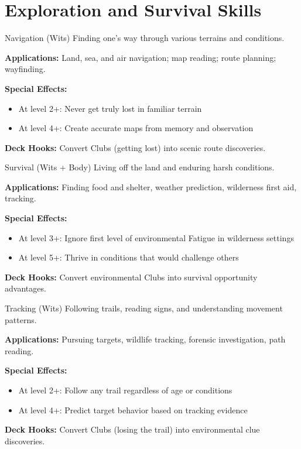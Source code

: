 \section{Exploration and Survival Skills}

\begin{skillbox}{Navigation (Wits)}
Finding one's way through various terrains and conditions.

\textbf{Applications:} Land, sea, and air navigation; map reading; route planning; wayfinding.

\textbf{Special Effects:}
\begin{itemize}
    \item At level 2+: Never get truly lost in familiar terrain
    \item At level 4+: Create accurate maps from memory and observation
\end{itemize}

\textbf{Deck Hooks:} Convert Clubs (getting lost) into scenic route discoveries.
\end{skillbox}

\begin{skillbox}{Survival (Wits + Body)}
Living off the land and enduring harsh conditions.

\textbf{Applications:} Finding food and shelter, weather prediction, wilderness first aid, tracking.

\textbf{Special Effects:}
\begin{itemize}
    \item At level 3+: Ignore first level of environmental Fatigue in wilderness settings
    \item At level 5+: Thrive in conditions that would challenge others
\end{itemize}

\textbf{Deck Hooks:} Convert environmental Clubs into survival opportunity advantages.
\end{skillbox}

\begin{skillbox}{Tracking (Wits)}
Following trails, reading signs, and understanding movement patterns.

\textbf{Applications:} Pursuing targets, wildlife tracking, forensic investigation, path reading.

\textbf{Special Effects:}
\begin{itemize}
    \item At level 2+: Follow any trail regardless of age or conditions
    \item At level 4+: Predict target behavior based on tracking evidence
\end{itemize}

\textbf{Deck Hooks:} Convert Clubs (losing the trail) into environmental clue discoveries.
\end{skillbox}

